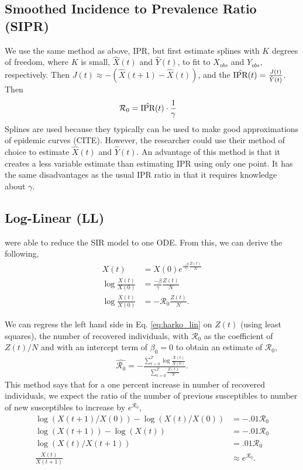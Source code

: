 \documentclass[12pt]{article}
\newcommand{\rr}{\ensuremath{\mathcal{R}_0}}
\begin{document}
\subsection{Smoothed Incidence to Prevalence Ratio (SIPR)}
We use the same method as above, IPR, but first estimate splines with $K$ degrees of freedom, where $K$ is small, $\hat{X}(t)$ and $\hat{Y}(t)$, to fit to $X_{obs}$ and $Y_{obs}$, respectively.  Then  $J(t) \approx -(\hat{X}(t+1) - \hat{X}(t))$, and the $\hat{\textnormal{IPR}}(t) = \frac{J(t)}{\hat{Y}(t)}$.  Then
\begin{align*}
\rr &= \hat{\textnormal{IPR}}(t) \cdot \frac{1}{\gamma}
\end{align*}
Splines are used because they typically can be used to make good approximations of epidemic curves (CITE).  However, the researcher could use their method of choice to estimate $\hat{X}(t)$ and $\hat{Y}(t)$.  An advantage of this method is that it creates a less variable estimate than estimating IPR using only one point.  It has the same disadvantages as the usual IPR ratio in that it requires knowledge about $\gamma$.

\subsection{Log-Linear (LL)}
\cite{harko2014exact} were able to reduce the SIR model to one ODE.  From this, we can derive the following,
\begin{align}
  X(t) &=  X(0) e^{\frac{-\beta}{\gamma}\frac{Z(t)}{N}} \nonumber\\
  \log \frac{X(t)}{X(0)} &=  \frac{-\beta }{\gamma}\frac{Z(t)}{N} \nonumber\\
  \log \frac{X(t)}{X(0)} &=  -\rr \frac{Z(t)}{N}. \label{eq:harko_lin}
\end{align}

We can regress the left hand side in Eq. \ref{eq:harko_lin} on $Z(t)$ (using least squares), the number of recovered individuals, with $\rr$ as the coefficient of $Z(t)/N$ and with an intercept term of $\beta_0=0$ to obtain an estimate of $\rr$,
\begin{align*}
  \hat{\rr} = -\frac{\sum_{t=0}^T \log \frac{ X(t)}{X(0)}}{\sum_{t=0}^T\frac{Z(t)}{N}}.
\end{align*}
This method says that for a one percent increase in number of recovered individuals, we expect the ratio of the number of previous susceptibles to number of new susceptibles to increase by $e^{\rr}$,
\begin{align*}
  \log \left ( X(t+1)/ X(0) \right ) - \log \left ( X(t)/X(0) \right ) &= - .01\rr\\
  \log \left ( X(t+1) \right ) - \log \left ( X(t) \right )  &=- .01\rr\\
  \log \left ( X(t) / X(t+1) \right ) &= .01\rr\\
  \frac{X(t)}{X(t+1)}  &\approx e^{\rr}.
\end{align*}
\end{document}
